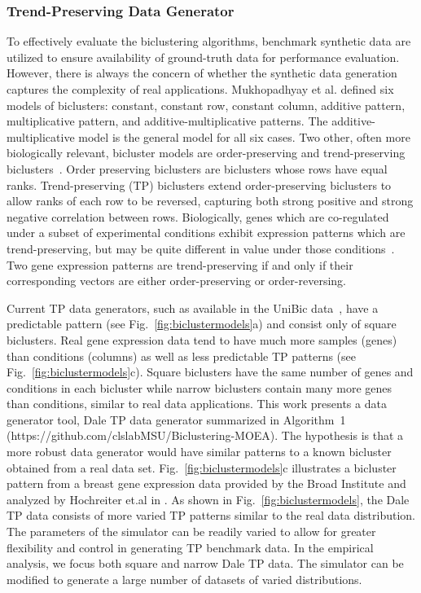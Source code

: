 \subsubsection*{ Trend-Preserving Data Generator}
To effectively evaluate the biclustering algorithms, benchmark synthetic data are utilized to ensure availability of ground-truth data for performance evaluation.
However, there is always the concern of whether the synthetic data generation captures the complexity of real applications.
Mukhopadhyay et al.\cite{mukhopadhyay2010biclustering} defined six models of biclusters: constant, constant row, constant column, additive pattern, multiplicative pattern, and additive-multiplicative patterns.
The additive-multiplicative model is the general model for all six cases.
Two other, often more biologically relevant, bicluster models are order-preserving and trend-preserving biclusters~\cite{wang2016unibic}.
Order preserving biclusters are biclusters whose rows have equal ranks.
Trend-preserving (TP) biclusters extend order-preserving biclusters to allow ranks of each row to be reversed, capturing both strong positive and strong negative correlation between rows.
Biologically, genes which are co-regulated under a subset of experimental conditions exhibit expression patterns which are trend-preserving, but may be quite different in value under those conditions~\cite{wang2016unibic}.
Two gene expression patterns are trend-preserving if and only if their corresponding vectors are either order-preserving or order-reversing. 

Current TP data generators, such as available in the UniBic data~\cite{wang2016unibic}, have a predictable pattern (see Fig.~\ref{fig:biclustermodels}a) and consist only of square biclusters. Real gene expression data tend to have much more samples (genes) than conditions (columns) as well as less predictable TP patterns (see Fig.~\ref{fig:biclustermodels}c).
Square biclusters have the same number of genes and conditions in each bicluster while narrow biclusters contain many more genes than conditions, similar to real data applications.
This work presents a data generator tool, Dale TP data generator summarized in Algorithm~1 (https://github.com/clslabMSU/Biclustering-MOEA). The hypothesis is that a more robust data generator would have similar patterns to a known bicluster obtained from a real data set. Fig.~\ref{fig:biclustermodels}c illustrates a bicluster pattern from a breast gene expression data provided by the Broad Institute and analyzed by Hochreiter et.al in \cite{hochreiter2010fabia}.  As shown in Fig.~\ref{fig:biclustermodels}, the Dale TP data consists of more varied TP patterns similar to the real data distribution. The parameters of the simulator can be readily varied to allow for greater flexibility and control in generating TP benchmark data.    
 In the empirical analysis, we focus both square and narrow Dale TP data. The simulator can be modified to generate a large number of datasets of varied distributions. 


